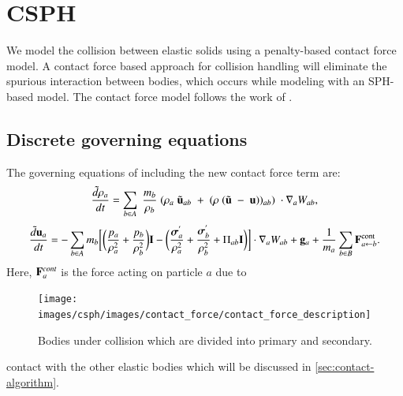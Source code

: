 \FloatBarrier%
\section{CSPH}
\label{sec:csph}

We model the collision between elastic solids using a penalty-based contact
force model. A contact force based approach for collision handling will
eliminate the spurious interaction between bodies, which occurs while modeling
with an SPH-based model. The contact force model follows the work of
\cite{mohseni2021particle}.

\subsection{Discrete governing equations}
\label{sec:discrete-governing-equations}
The governing equations of including the new contact force term are:
\begin{equation}
\label{eqn:sph-continuity}
  \frac{\tilde{d}\rho_a}{dt} = \sum_{b \in A} \; \frac{m_b}{\rho_{b}} \; (
  \rho_{a} \; \tilde{\mathbf{u}}_{ab} \; + \;
  (\rho \; (\tilde{\mathbf{u}} \; - \;
  \mathbf{u}))_{ab}) \; \cdot \nabla_{a} W_{ab},
\end{equation}
\begin{equation}
\label{eqn:sph-momentum}
  \frac{\tilde{d}\mathbf{u}_{a}}{dt} = - \sum_{b \in A} m_b \bigg[
  \bigg(\frac{p_a}{\rho_a^2} + \frac{p_b}{\rho_b^2}\bigg) \mathbf{I} -
  \bigg(\frac{\boldsymbol{\sigma}^{'}_{a}}{\rho_a^2} +
  \frac{\boldsymbol{\sigma}^{'}_{b}}{\rho_b^2} + \Pi_{ab} \mathbf{I} \bigg) \bigg]  \cdot \nabla_{a} W_{ab} +
  \mathbf{g}_{a} + \frac{1}{m_a}\sum_{b \in B} \mathbf{F}^{\text{cont}}_{a \leftarrow b}.
\end{equation}
Here, $\mathbf{F}^{cont}_{a}$ is the force acting on particle $a$ due to
\begin{figure}[!htpb]
  \centering
  \texttt{[image: images/csph/images/contact\_force/contact\_force\_description]}
  \caption{Bodies under collision which are divided into primary and
    secondary.}
\label{fig:bodies_under_collision}
\end{figure}
contact with the other elastic bodies which will be discussed in
\cref{sec:contact-algorithm}.

\FloatBarrier%

